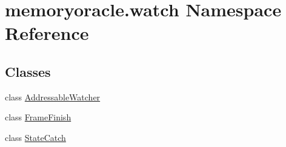 \hypertarget{namespacememoryoracle_1_1watch}{}\section{memoryoracle.\+watch Namespace Reference}
\label{namespacememoryoracle_1_1watch}
\subsection*{Classes}
\begin{DoxyCompactItemize}
\item 
class \hyperlink{classmemoryoracle_1_1watch_1_1AddressableWatcher}{Addressable\+Watcher}
\item 
class \hyperlink{classmemoryoracle_1_1watch_1_1FrameFinish}{Frame\+Finish}
\item 
class \hyperlink{classmemoryoracle_1_1watch_1_1StateCatch}{State\+Catch}
\end{DoxyCompactItemize}
